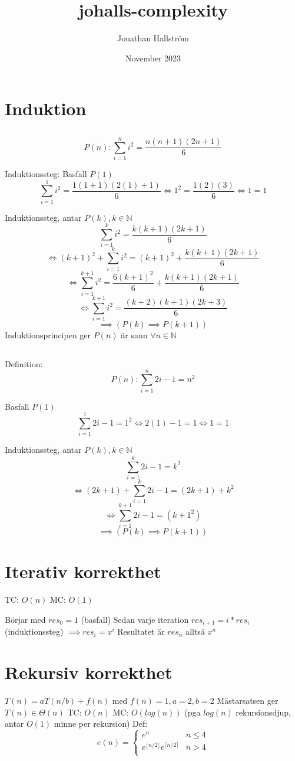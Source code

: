 \documentclass{article}
\title{johalls-complexity}
\author{Jonathan Hallström}
\date{November 2023}
\begin{document}
\maketitle


\section{Induktion}
\subsection{}

$$P(n):  \sum _{i=1}^n i^2=\frac{n(n+1)(2n+1)}{6}$$

Induktionssteg:
Basfall  $P(1)$
$$\sum _{i=1}^1 i^2=\frac{1(1+1)(2(1)+1)}{6} \iff 1^2=\frac{1(2)(3)}{6} \iff 1=1$$

Induktionssteg, antar $P(k), k \in \mathbb{N}$
$$\sum _{i=1}^k i^2=\frac{k(k+1)(2k+1)}{6}$$
$$ \iff (k+1)^2 + \sum _{i=1}^k i^2=(k+1)^2+\frac{k(k+1)(2k+1)}{6}$$
$$\iff \sum _{i=1}^{k+1} i^2=\frac{6(k+1)^2}{6}+\frac{k(k+1)(2k+1)}{6}$$
$$\iff \sum _{i=1}^{k+1} i^2=\frac{(k+2)(k+1)(2k+3)}{6}$$
$$\implies (P(k) \implies P(k+1))$$
Induktionsprincipen ger $P(n)$ är sann $\forall n \in \mathbb{N}$

\subsection{}
Definition:
$$P(n):  \sum _{i=1}^n 2i-1=n^2$$

Basfall  $P(1)$
$$\sum _{i=1}^1 2i-1=1^2\iff 2(1)-1=1\iff1=1$$

Induktionssteg, antar $P(k),k \in \mathbb{N}$
$$\sum _{i=1}^k 2i-1=k^2$$
$$\iff (2k+1)+\sum _{i=1}^k 2i-1=(2k+1)+k^2$$
$$\iff \sum _{i=1}^{k+1} 2i-1=(k+1^2)$$
$$\implies (P(k) \implies P(k+1))$$

\section{Iterativ korrekthet}
TC: $O(n)$
MC: $O(1)$

Börjar med $res_0=1$ (basfall)
Sedan varje iteration $res_{i+1}=i*res_i$ (induktionssteg)
$\implies res_i=x^i$
Resultatet är $res_n$ alltså $x^n$

\section{Rekursiv korrekthet}
$T(n) = aT(n/b)+f(n)$ med $f(n)=1,a=2,b=2$
Mästarsatsen ger $T(n) \in\mathbb{\Theta}(n)$
TC: $O(n)$ 
MC: $O(log(n))$ (pga $log(n)$ rekursionsdjup, antar $O(1)$ minne per rekursion)
Def: $$e(n) = \begin{cases}
e^n & n \leq 4 \\
e^{\lfloor n/2 \rfloor}e^{\lceil n/2 \rceil} & n > 4\\
\end{cases}
$$
\end{document}
